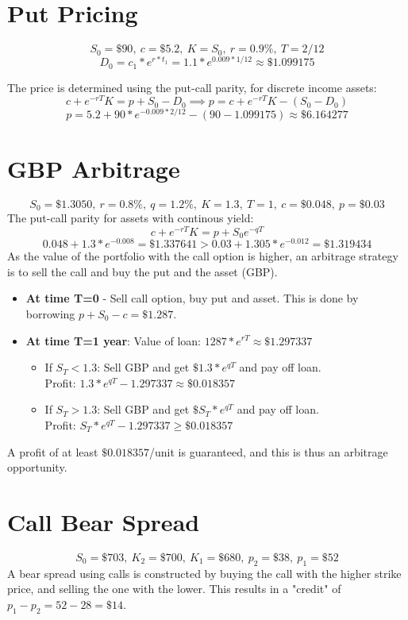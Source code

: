 \documentclass{article}
\begin{document}
\thispagestyle{fancy}

\section{Put Pricing}

$$S_0 = \$90, \ c = \$5.2, \ K = S_0, \ r = 0.9\%, \ T = 2/12 $$
$$D_0 = c_1 * e^{r * t_1} = 1.1 * e^{0.009 * 1/12} \approx \$1.099175 $$

The price is determined using the put-call parity, for discrete income assets: 
$$ c + e^{-rT}K = p + S_0 - D_0 \implies p = c + e^{-rT}K - (S_0 - D_0)$$
$$p = 5.2 + 90 * e^{-0.009 * 2/12} - (90 - 1.099175) \approx \$6.164277$$

\section{GBP Arbitrage}

$$S_0 = \$1.3050, \ r = 0.8\%, \ q = 1.2\%, \ K = 1.3, \ T = 1, \ c = \$0.048, \ p=\$0.03$$
The put-call parity for assets with continous yield: 
$$c + e^{-rT}K  = p + S_0 e^{-qT}$$
$$0.048 + 1.3 * e^{-0.008} = \$1.337641 > 0.03 + 1.305*e^{-0.012} = \$1.319434$$
As the value of the portfolio with the call option is higher, an arbitrage strategy is to sell the call and buy the put and the asset (GBP).
\begin{itemize}
	\item \textbf{At time T=0} - Sell call option, buy put and asset. This is done by borrowing $p + S_0 -c = \$1.287$.
	\item \textbf{At time T=1 year}: Value of loan: $1287 * e^{rT} \approx \$1.297337$\begin{itemize}
		\item If $S_T < 1.3$: Sell GBP and get $\$1.3 * e^{qT}$ and pay off loan. \\Profit: $1.3*e^{qT} - 1.297337 \approx \$0.018357$ 
		\item If $S_T > 1.3$: Sell GBP and get $\$S_T * e^{qT}$ and pay off loan. \\Profit: $S_T*e^{qT} - 1.297337 \geq \$0.018357$ 
	\end{itemize}
\end{itemize}
A profit of at least $\$0.018357$/unit is guaranteed, and this is thus an arbitrage opportunity.

\section{Call Bear Spread}
$$ S_0 = \$703, \ K_2 = \$700, \ K_1=\$680, \ p_2 = \$38, \ p_1 = \$52$$
A bear spread using calls is constructed by buying the call with the higher strike price, and selling the one with the lower. This results in a "credit" of $p_1 - p_2 = 52 - 28 = \$14$.
\end{document}
